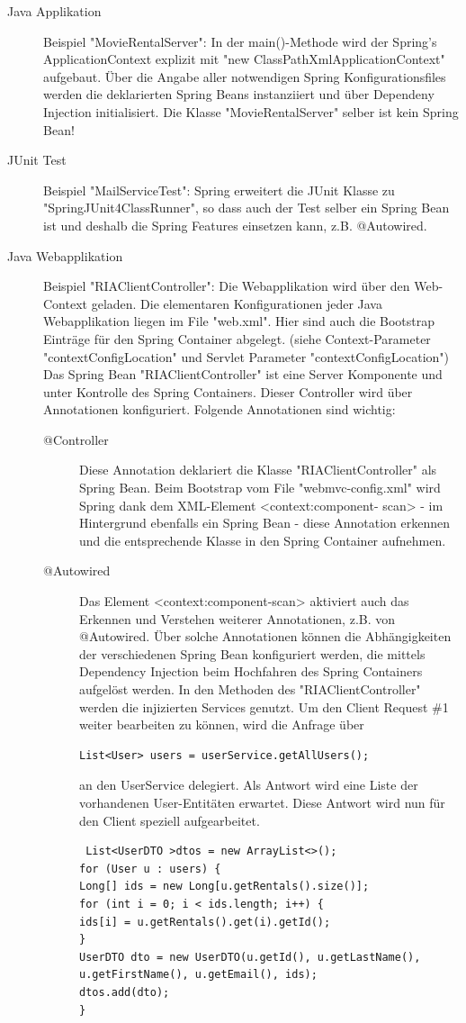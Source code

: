 \documentclass[a4paper,10pt]{scrreprt}
\begin{document}
\begin{description}
\item[Java Applikation]
Beispiel "MovieRentalServer": In der main()-Methode wird der Spring's ApplicationContext
explizit mit "new ClassPathXmlApplicationContext" aufgebaut. Über die Angabe aller
notwendigen Spring Konfigurationsfiles werden die deklarierten Spring Beans instanziiert und
über Dependeny Injection initialisiert. Die Klasse "MovieRentalServer" selber ist kein Spring
Bean!

\item[JUnit Test]
Beispiel "MailServiceTest": Spring erweitert die JUnit Klasse zu "SpringJUnit4ClassRunner",
so dass auch der Test selber ein Spring Bean ist und deshalb die Spring Features einsetzen
kann, z.B. @Autowired.
\item[Java Webapplikation]
Beispiel "RIAClientController": Die Webapplikation wird über den Web-Context geladen. Die
elementaren Konfigurationen jeder Java Webapplikation liegen im File "web.xml". Hier sind
auch die Bootstrap Einträge für den Spring Container abgelegt. (siehe Context-Parameter
"contextConfigLocation" und Servlet Parameter "contextConfigLocation")
Das Spring Bean "RIAClientController" ist eine Server Komponente und unter Kontrolle des Spring
Containers. Dieser Controller wird über Annotationen konfiguriert. Folgende Annotationen sind
wichtig:
\begin{description}

\item[@Controller]
Diese Annotation deklariert die Klasse "RIAClientController" als Spring Bean. Beim Bootstrap
vom File "webmvc-config.xml" wird Spring dank dem XML-Element <context:component-
scan> - im Hintergrund ebenfalls ein Spring Bean - diese Annotation erkennen und die
entsprechende Klasse in den Spring Container aufnehmen.
\item[@Autowired]
Das Element <context:component-scan> aktiviert auch das Erkennen und Verstehen weiterer
Annotationen, z.B. von @Autowired. Über solche Annotationen können die Abhängigkeiten
der verschiedenen Spring Bean konfiguriert werden, die mittels Dependency Injection beim
Hochfahren des Spring Containers aufgelöst werden.
In den Methoden des "RIAClientController" werden die injizierten Services genutzt. Um den Client
Request \#1 weiter bearbeiten zu können, wird die Anfrage über
\begin{verbatim}
List<User> users = userService.getAllUsers(); 
\end{verbatim}
an den UserService delegiert. Als Antwort wird eine Liste der vorhandenen User-Entitäten erwartet.
Diese Antwort wird nun für den Client speziell aufgearbeitet.
\begin{lstlisting}
 List<UserDTO >dtos = new ArrayList<>();
for (User u : users) {
Long[] ids = new Long[u.getRentals().size()];
for (int i = 0; i < ids.length; i++) {
ids[i] = u.getRentals().get(i).getId();
}
UserDTO dto = new UserDTO(u.getId(), u.getLastName(),
u.getFirstName(), u.getEmail(), ids);
dtos.add(dto);
}
\end{lstlisting}


\end{description}
\end{description}
\end{document}
